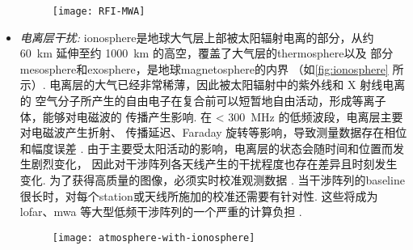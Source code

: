 \begin{itemize}
\begin{figure}[htp]
  \centering
  \texttt{[image: RFI-MWA]}
  \label{fig:rfi-mwa}
\end{figure}

\item
\emph{电离层干扰:}
\acf{ionosphere}是地球大气层上部被太阳辐射电离的部分，从约 \SI{60}{\km}
延伸至约 \SI{1000}{\km} 的高空，覆盖了大气层的\ac{thermosphere}以及
部分\ac{mesosphere}和\ac{exosphere}，是地球\ac{magnetosphere}的内界
（如\autoref{fig:ionosphere} 所示）.
电离层的大气已经非常稀薄，因此被太阳辐射中的紫外线和 X 射线电离的
空气分子所产生的自由电子在复合前可以短暂地自由活动，形成等离子体，能够对电磁波的
传播产生影响.
在 \SI{< 300}{\MHz} 的低频波段，电离层主要对电磁波产生折射、
传播延迟、Faraday 旋转等影响，导致测量数据存在相位和幅度误差
\cite{intema2009,thompson2017}.
由于主要受太阳活动的影响，电离层的状态会随时间和位置而发生剧烈变化，
因此对干涉阵列各天线产生的干扰程度也存在差异且时刻发生变化.
为了获得高质量的图像，必须实时校准观测数据 \cite{intema2009,jordan2017}.
当干涉阵列的\ac{baseline}很长时，对每个\ac{station}或天线所施加的校准还需要有针对性.
这些将成为 \ac{lofar}、\ac{mwa} 等大型低频干涉阵列的一个严重的计算负担
\cite{intema2009,deGasperin2018}.

\begin{figure}[htp]
  \centering
  \texttt{[image: atmosphere-with-ionosphere]}
  \label{fig:ionosphere}
\end{figure}


\end{itemize}
